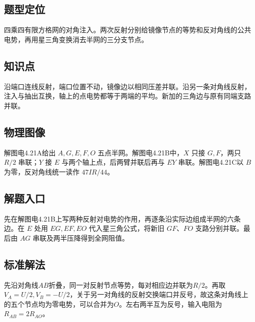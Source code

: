 \documentclass[UTF8,fontset=fandol,a4paper,11pt]{ctexart}
\begin{document}


\subsection*{题型定位}

四乘四有限方格网的对角注入。两次反射分别给镜像节点的等势和反对角线的公共电势，再用星三角变换消去半网的三分支节点。



\subsection*{知识点}

沿端口连线反射，端口位置不动，镜像边以相同压差并联。沿另一条对角线反射，注入与抽出互换，轴上的点电势都等于两端的平均。新加的三角边与原有同端支路并联。



\subsection*{物理图像}

解图电4.21A给出 $A,G,E,F,O$ 五点半网。解图电4.21B中，$X$ 只接 $G,F$，两只 $R/2$ 串联；$Y$ 接 $E$ 与两个轴上点，后两臂并联后再与 $EY$ 串联。解图电4.21C以 $B$ 为零，反对角线统一读作 $47IR/44$。



\subsection*{解题入口}

先在解图电4.21B上写两种反射对电势的作用，再逐条沿实际边组成半网的六条边。在 $E$ 处用 $EG,EF,EO$ 代入星三角公式，将新旧 $GF$、$FO$ 支路分别并联。最后由 $AG$ 串联及两半压降得到全网阻值。


\subsection*{标准解法}

先沿对角线$AB$折叠，同一对反射节点等势，每对相应边并联为$R/2$。再取$V_A=U/2,V_B=-U/2$，关于另一对角线的反射交换端口并反号，故这条对角线上的五个节点均为零电势，可以合并为$O$。左右两半互为反号，输入电阻为$R_{AB}=2R_{AO}$。
\end{document}

